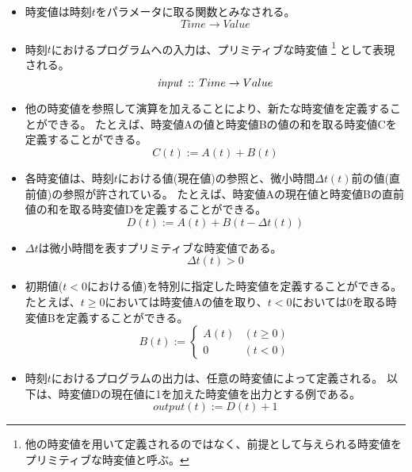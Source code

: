 \begin{itemize}
  \item
  時変値は時刻$t$をパラメータに取る関数とみなされる。
  \begin{equation*}
    Time \rightarrow Value
  \end{equation*}

  \item
  時刻$t$におけるプログラムへの入力は、プリミティブな時変値
  \footnote{他の時変値を用いて定義されるのではなく、前提として与えられる時変値をプリミティブな時変値と呼ぶ。}
  として表現される。
  \begin{equation*}
    {\it input} \, :: \, Time \rightarrow Value
  \end{equation*}

  \item
  他の時変値を参照して演算を加えることにより、新たな時変値を定義することができる。
  たとえば、時変値Aの値と時変値Bの値の和を取る時変値Cを定義することができる。
  \begin{equation*}
    C(t) := A(t) + B(t)
  \end{equation*}

  \item
  各時変値は、時刻$t$における値(現在値)の参照と、微小時間$ \Delta t(t) $前の値(直前値)の参照が許されている。
  たとえば、時変値Aの現在値と時変値Bの直前値の和を取る時変値Dを定義することができる。
  \begin{equation*}
    D(t) := A(t) + B(t - \Delta t(t))
  \end{equation*}

  \item
  $ \Delta t $は微小時間を表すプリミティブな時変値である。
  \begin{equation*}
    \Delta t(t) > 0
  \end{equation*}

  \item
  初期値($ t < 0 $における値)を特別に指定した時変値を定義することができる。
  たとえば、$t \geq 0$においては時変値Aの値を取り、$t < 0$においては0を取る時変値Bを定義することができる。
  \begin{equation*}
    B(t) := \begin{cases}
      A(t) & (t \geq 0) \\
      0 & (t < 0)
    \end{cases}
  \end{equation*}

  \item
  時刻$t$におけるプログラムの出力は、任意の時変値によって定義される。
  以下は、時変値Dの現在値に1を加えた時変値を出力とする例である。
  \begin{equation*}
    output(t) := D(t) + 1
  \end{equation*}
\end{itemize}

